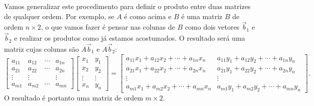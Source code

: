 \documentclass[../livro.tex]{subfiles}  %
\begin{document}
Vamos generalizar este procedimento para definir o produto entre duas matrizes de qualquer ordem. Por exemplo, se $A$ é como acima e $B$ é uma matriz $B$ de ordem $n \times 2$, o que vamos fazer é pensar nas colunas de $B$ como dois vetores $\vec{b}_1$ e $\vec{b}_2$ e realizar os produtos como já estamos acostumados. O resultado será uma matriz cujas colunas são $A \vec{b}_1$ e $A \vec{b}_2$:
\begin{equation}
\begin{bmatrix}
a_{11} & a_{12} & \cdots & a_{1n} \\
a_{21} & a_{22} & \cdots & a_{2n} \\
\vdots & \vdots &        & \vdots \\
a_{m1} & a_{m2} & \cdots & a_{mn} 
\end{bmatrix}
\begin{bmatrix} 
x_{1} & y_1 \\
x_{2} & y_2 \\
\vdots & \vdots \\
x_{n} & y_n 
\end{bmatrix} =
\begin{bmatrix}
a_{11} x_{1} + a_{12} x_{2} + \cdots + a_{1n} x_{n} & a_{11} y_{1} + a_{12} y_{2} + \cdots + a_{1n} y_{n}\\
a_{21} x_{1} + a_{22} x_{2} + \cdots + a_{2n} x_{n} & a_{21} y_{1} + a_{22} y_{2} + \cdots + a_{2n} y_{n}\\
\vdots & \vdots \\
a_{m1} x_{1} + a_{m2} x_{2} + \cdots + a_{mn} x_{n} & a_{m1} y_{1} + a_{m2} y_{2} + \cdots + a_{mn} y_{n}
\end{bmatrix}.
\end{equation} O resultado é portanto uma matriz de ordem $m\times 2$.
\end{document}
